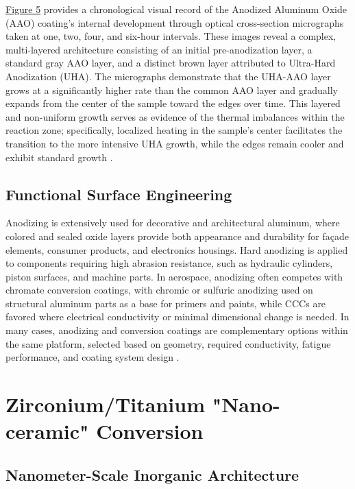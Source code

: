 \documentclass[12pt]{article}
\begin{document}
            \hyperref[anodizing_layer_dt]{Figure 5} provides a chronological visual record of the Anodized Aluminum Oxide (AAO) coating's internal development through optical cross-section micrographs taken at one, two, four, and six-hour intervals. These images reveal a complex, multi-layered architecture consisting of an initial pre-anodization layer, a standard gray AAO layer, and a distinct brown layer attributed to Ultra-Hard Anodization (UHA). The micrographs demonstrate that the UHA-AAO layer grows at a significantly higher rate than the common AAO layer and gradually expands from the center of the sample toward the edges over time. This layered and non-uniform growth serves as evidence of the thermal imbalances within the reaction zone; specifically, localized heating in the sample's center facilitates the transition to the more intensive UHA growth, while the edges remain cooler and exhibit standard growth \autocite{rozenblium_comprehensive_2024}.

        \subsection{Functional Surface Engineering}

            Anodizing is extensively used for decorative and architectural aluminum, where colored and sealed oxide layers provide both appearance and durability for fa\c{c}ade elements, consumer products, and electronics housings. Hard anodizing is applied to components requiring high abrasion resistance, such as hydraulic cylinders, piston surfaces, and machine parts. In aerospace, anodizing often competes with chromate conversion coatings, with chromic or sulfuric anodizing used on structural aluminum parts as a base for primers and paints, while CCCs are favored where electrical conductivity or minimal dimensional change is needed. In many cases, anodizing and conversion coatings are complementary options within the same platform, selected based on geometry, required conductivity, fatigue performance, and coating system design \autocite{asm_surface_2007}.

    \section{Zirconium/Titanium "Nano-ceramic" Conversion}
        \subsection{Nanometer-Scale Inorganic Architecture}
\end{document}
